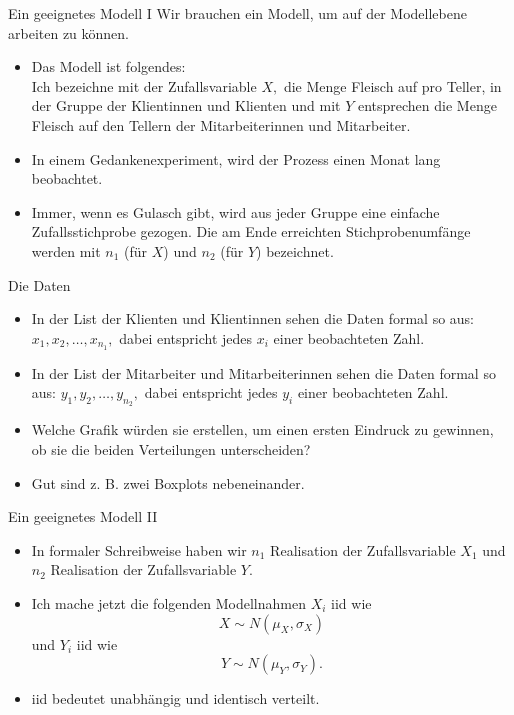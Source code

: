 \documentclass[usenames,dvipsnames,handout]{beamer}
\begin{document}
\begin{frame}{Ein geeignetes Modell I}
Wir brauchen ein Modell, um auf der Modellebene arbeiten zu können.
\begin{itemize}
\item{Das Modell ist folgendes:\\ Ich bezeichne mit der Zufallsvariable $X,$ die Menge Fleisch auf pro Teller, in der Gruppe
der Klientinnen und Klienten und mit $Y$ entsprechen die Menge Fleisch auf den Tellern der 
Mitarbeiterinnen und Mitarbeiter. }\pause
\item{In einem Gedankenexperiment, wird der Prozess einen Monat lang beobachtet.}\pause
\item{Immer, wenn es Gulasch gibt, wird aus jeder Gruppe eine einfache Zufallsstichprobe  gezogen. Die am Ende erreichten Stichprobenumfänge
werden mit $n_{1}$ (für $X$) und $n_{2}$ (für $Y$) bezeichnet.}\pause
\end{itemize}
\end{frame}

\begin{frame}{Die Daten}
\begin{itemize}
\item{In der List der Klienten und Klientinnen sehen die Daten formal so aus:
$x_{1},x_{2},\dots,x_{n_{1}},$ dabei entspricht jedes $x_{i}$ einer beobachteten Zahl. }\pause
\item{In der List der Mitarbeiter und Mitarbeiterinnen sehen die Daten formal so aus:
$y_{1},y_{2},\dots,y_{n_{2}},$ dabei entspricht jedes $y_{i}$ einer beobachteten Zahl. }\pause
\item{Welche Grafik würden sie erstellen, um einen ersten Eindruck zu gewinnen, ob sie die beiden
Verteilungen unterscheiden?}\pause
\item{Gut sind z. B. zwei Boxplots nebeneinander.}
\end{itemize}
\end{frame}

\begin{frame}{Ein geeignetes Modell II}
\begin{itemize}
\item{In formaler Schreibweise haben wir $n_{1}$ Realisation der Zufallsvariable $X_{1}$ und $n_{2}$ 
Realisation der Zufallsvariable $Y.$}
\item{Ich mache jetzt die folgenden Modellnahmen
$X_{i}$ iid wie 
\begin{equation}\label{eq1}
X \sim N(\mu_{X},\sigma_{X})
\end{equation}
und $Y_{i}$ iid wie
\begin{equation}\label{eq2}
Y \sim N(\mu_{Y},\sigma_{Y}).
\end{equation}
}
\item{iid bedeutet unabhängig und identisch verteilt.}
\end{itemize}
\end{frame}
\end{document}
